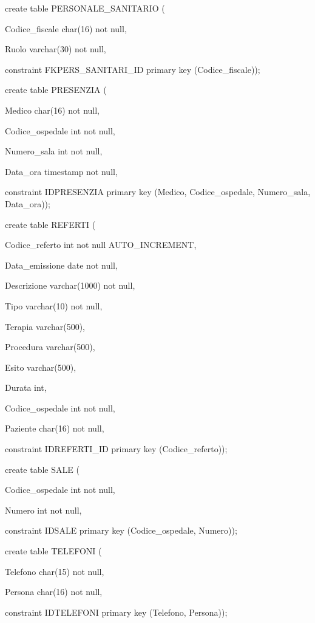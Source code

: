 \documentclass[a4paper,12pt]{report}
\begin{document}
\noindent create table PERSONALE\_SANITARIO (

     Codice\_fiscale char(16) not null,

     Ruolo varchar(30) not null,

     constraint FKPERS\_SANITARI\_ID primary key (Codice\_fiscale)); \newline

\noindent create table PRESENZIA (

     Medico char(16) not null,

     Codice\_ospedale int not null,

     Numero\_sala int not null,

     Data\_ora timestamp not null,

     constraint IDPRESENZIA primary key (Medico, Codice\_ospedale, Numero\_sala, Data\_ora)); \newline

\noindent create table REFERTI (

     Codice\_referto int not null AUTO\_INCREMENT,

     Data\_emissione date not null,

     Descrizione varchar(1000) not null,

     Tipo varchar(10) not null,

     Terapia varchar(500),

     Procedura varchar(500),

     Esito varchar(500),

     Durata int,

     Codice\_ospedale int not null,

     Paziente char(16) not null,

     constraint IDREFERTI\_ID primary key (Codice\_referto)); \newline

\noindent create table SALE (

     Codice\_ospedale int not null,

     Numero int not null,

     constraint IDSALE primary key (Codice\_ospedale, Numero)); \newline

\noindent create table TELEFONI (

     Telefono char(15) not null,

     Persona char(16) not null,

     constraint IDTELEFONI primary key (Telefono, Persona)); \newline
\end{document}
